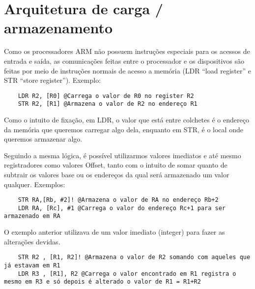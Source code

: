 \section{Arquitetura de carga / armazenamento}

Como os processadores ARM não possuem instruções especiais para os acessos de entrada e saída, as comunicações feitas entre o processador e os dispositivos são feitas por meio de instruções normais de acesso a memória (LDR “load register” e STR “store register”). Exemplo: 

\begin{verbatim}
	LDR R2, [R0] @Carrega o valor de R0 no register R2
	STR R2, [R1] @Armazena o valor de R2 no endereço R1
\end{verbatim}

Como o intuito de fixação, em LDR, o valor que está entre colchetes é o endereço da memória que queremos carregar algo dela, enquanto em STR, é o local onde queremos armazenar algo.

Seguindo a mesma lógica, é possível utilizarmos valores imediatos e até mesmo registradores como valores Offset, tanto com o intuito de somar quanto de subtrair os valores base ou os endereços da qual será armazenado um valor qualquer. Exemplos:

\begin{verbatim}
	STR RA,[Rb, #2]! @Armazena o valor de RA no endereço Rb+2
	LDR RA, [Rc], #1 @Carrega o valor do endereço Rc+1 para ser armazenado em RA
\end{verbatim}

O exemplo anterior utilizava de um valor imediato (integer) para fazer as alterações devidas.

\begin{verbatim}
	STR R2 , [R1, R2]! @Armazena o valor de R2 somando com aqueles que já estavam em R1
	LDR R3 , [R1], R2 @Carrega o valor encontrado em R1 registra o mesmo em R3 e só depois é alterado o valor de R1 = R1+R2
\end{verbatim}
